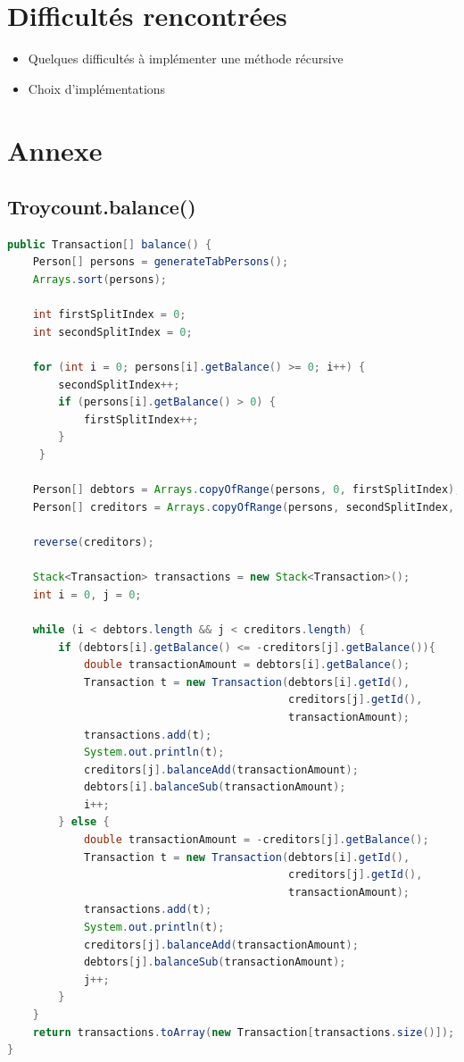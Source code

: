 \documentclass[12pt, a4paper, table]{article}
\begin{document}
\section{Difficultés rencontrées}
\begin{itemize}
	\item Quelques difficultés à implémenter une méthode récursive
	\item Choix d'implémentations
\end{itemize}



\newpage
\section*{Annexe}

\subsection*{Troycount.balance()}

\begin{lstlisting}[language=Java]
public Transaction[] balance() {
    Person[] persons = generateTabPersons();
    Arrays.sort(persons);

    int firstSplitIndex = 0;
    int secondSplitIndex = 0;

    for (int i = 0; persons[i].getBalance() >= 0; i++) {
    	secondSplitIndex++;
    	if (persons[i].getBalance() > 0) {
    		firstSplitIndex++;
        }
     }

    Person[] debtors = Arrays.copyOfRange(persons, 0, firstSplitIndex);
    Person[] creditors = Arrays.copyOfRange(persons, secondSplitIndex, persons.length);

    reverse(creditors);

    Stack<Transaction> transactions = new Stack<Transaction>();
    int i = 0, j = 0;

    while (i < debtors.length && j < creditors.length) {
        if (debtors[i].getBalance() <= -creditors[j].getBalance()){
            double transactionAmount = debtors[i].getBalance();
            Transaction t = new Transaction(debtors[i].getId(),
                                            creditors[j].getId(),
                                            transactionAmount);
            transactions.add(t);
            System.out.println(t);
            creditors[j].balanceAdd(transactionAmount);
            debtors[i].balanceSub(transactionAmount);
            i++;
        } else {
            double transactionAmount = -creditors[j].getBalance();
            Transaction t = new Transaction(debtors[i].getId(),
                                            creditors[j].getId(),
                                            transactionAmount);
            transactions.add(t);
            System.out.println(t);
            creditors[j].balanceAdd(transactionAmount);
            debtors[j].balanceSub(transactionAmount);
            j++;
		}
	}
    return transactions.toArray(new Transaction[transactions.size()]);
}
\end{lstlisting}
\newpage
\end{document}
